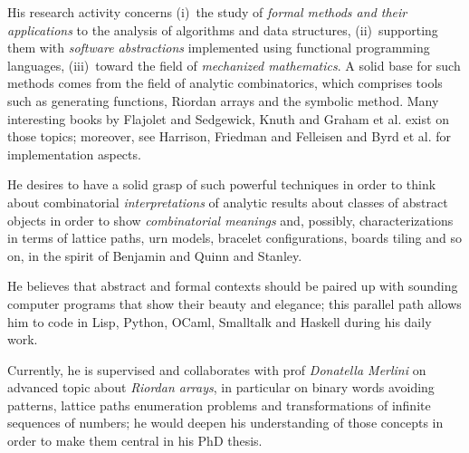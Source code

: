 \documentclass[a4paper]{tufte-handout}
\begin{document}
    His research activity concerns (i)~the study of \textit{formal methods
    and their applications} to the analysis of algorithms and data structures,
    (ii)~supporting them with \textit{software abstractions} implemented using functional
    programming languages, (iii)~toward the field of \textit{mechanized mathematics}.  
    A solid base for such methods comes from the field
    of analytic combinatorics, which comprises tools such as generating
    functions, Riordan arrays and the symbolic method. Many interesting books
    by Flajolet and Sedgewick,
    Knuth and Graham et al.  exist on those topics; moreover,  see
    Harrison, Friedman and Felleisen
     and
    Byrd et al. for implementation aspects. 


    He desires to have a solid grasp of such powerful techniques in order to
    think about combinatorial \emph{interpretations} of
    analytic results about classes of abstract objects in order to show
    \emph{combinatorial meanings} and, possibly, characterizations in terms
    of lattice paths, urn models, bracelet configurations, boards
    tiling and so on, in the spirit of Benjamin and Quinn  and Stanley.

    He believes that abstract and formal contexts should be paired up with
    sounding computer programs that show their beauty and elegance; this
    parallel path allows him to code in Lisp, Python, OCaml, Smalltalk and
    Haskell during his daily work.

    Currently, he is supervised and collaborates with prof \textit{Donatella
    Merlini} on advanced topic about \textit{Riordan arrays}, in particular on
    binary words avoiding patterns, lattice paths enumeration problems and
    transformations of infinite sequences of numbers; he would deepen his
    understanding of those concepts in order to make them central in his PhD
    thesis. 
\end{document}

